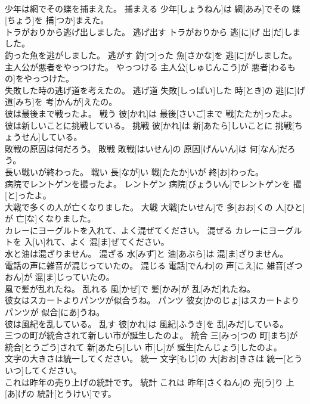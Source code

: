 \documentclass[8pt]{extreport}
\begin{document}
\begin{CJK}{UTF8}{min}
\\	少年は網でその蝶を捕まえた。	捕まえる	少年[しょうねん]は 網[あみ]でその 蝶[ちょう]を 捕[つか]まえた。	
\\	トラがおりから逃げ出しました。	逃げ出す	トラがおりから 逃[に]げ 出[だ]しました。	
\\	釣った魚を逃がしました。	逃がす	釣[つ]った 魚[さかな]を 逃[に]がしました。	
\\	主人公が悪者をやっつけた。	やっつける	主人公[しゅじんこう]が 悪者[わるもの]をやっつけた。	
\\	失敗した時の逃げ道を考えたの。	逃げ道	失敗[しっぱい]した 時[とき]の 逃[に]げ 道[みち]を 考[かんが]えたの。	
\\	彼は最後まで戦ったよ。	戦う	彼[かれ]は 最後[さいご]まで 戦[たたか]ったよ。	
\\	彼は新しいことに挑戦している。	挑戦	彼[かれ]は 新[あたら]しいことに 挑戦[ちょうせん]している。	
\\	敗戦の原因は何だろう。	敗戦	敗戦[はいせん]の 原因[げんいん]は 何[なん]だろう。	
\\	長い戦いが終わった。	戦い	長[なが]い 戦[たたか]いが 終[お]わった。	
\\	病院でレントゲンを撮ったよ。	レントゲン	病院[びょういん]でレントゲンを 撮[と]ったよ。	
\\	大戦で多くの人が亡くなりました。	大戦	大戦[たいせん]で 多[おお]くの 人[ひと]が 亡[な]くなりました。	
\\	カレーにヨーグルトを入れて、よく混ぜてください。	混ぜる	カレーにヨーグルトを 入[い]れて、よく 混[ま]ぜてください。	
\\	水と油は混ざりません。	混ざる	水[みず]と 油[あぶら]は 混[ま]ざりません。	
\\	電話の声に雑音が混じっていたの。	混じる	電話[でんわ]の 声[こえ]に 雑音[ざつおん]が 混[ま]じっていたの。	
\\	風で髪が乱れたね。	乱れる	風[かぜ]で 髪[かみ]が 乱[みだ]れたね。	
\\	彼女はスカートよりパンツが似合うね。	パンツ	彼女[かのじょ]はスカートよりパンツが 似合[にあ]うね。	
\\	彼は風紀を乱している。	乱す	彼[かれ]は 風紀[ふうき]を 乱[みだ]している。	
\\	三つの町が統合されて新しい市が誕生したのよ。	統合	三[みっ]つの 町[まち]が 統合[とうごう]されて 新[あたら]しい 市[し]が 誕生[たんじょう]したのよ。	
\\	文字の大きさは統一してください。	統一	文字[もじ]の 大[おお]きさは 統一[とういつ]してください。	
\\	これは昨年の売り上げの統計です。	統計	これは 昨年[さくねん]の 売[う]り 上[あ]げの 統計[とうけい]です。	

\end{CJK}
\end{document}
